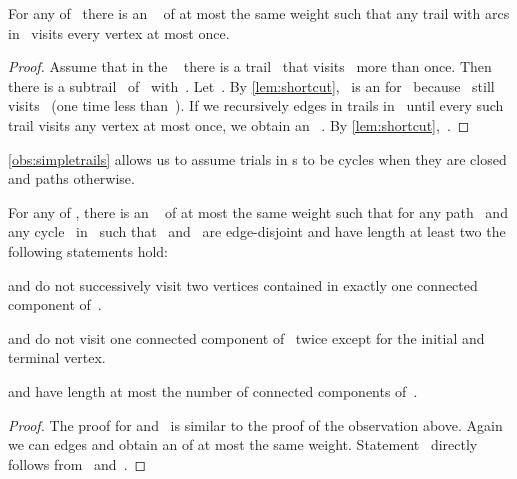 \begin{observation}
  \label{obs:simpletrails}
  For any \EE{}  of~ there is an \EE{}~ of at most the same weight such that any trail with arcs in~ visits every vertex at most once.
\end{observation}
\begin{proof}
  Assume that in the \EE{}~ there is a trail~ that visits~ more than once. Then there is a subtrail~ of~ with~. Let~. By \autoref{lem:shortcut},~ is an \EE{} for~ because ~still visits~ (one time less than~). If we recursively  edges in trails in~ until every such trail visits any vertex at most once, we obtain an \EE{}~. By \autoref{lem:shortcut},~.
\end{proof}
\autoref{obs:simpletrails} allows us to assume trials in \EE s to be cycles when they are closed and paths otherwise.


\begin{observation}
  \label{obs:shorttrails}
  For any \EE{}  of , there is an \EE~ of at most the same weight such that for any path~ and any cycle~ in~ such that~ and~ are edge-disjoint and have length at least two the following statements hold: 
  \begin{lemenum}
  \item  and  do not successively visit two vertices contained in exactly one connected component of~. \label{enu:osht1}
  \item  and  do not visit one connected component of~ twice except for the initial and terminal vertex. \label{enu:osht2}
  \item  and  have length at most the number of connected components of~. \label{enu:osht3}
  \end{lemenum}
\end{observation}
\begin{proof}
The proof for  and~ is similar to the proof of the observation above.  Again we can  edges and obtain an \EE{} of at most the same weight. Statement~ directly follows from~ and~.
\end{proof}




